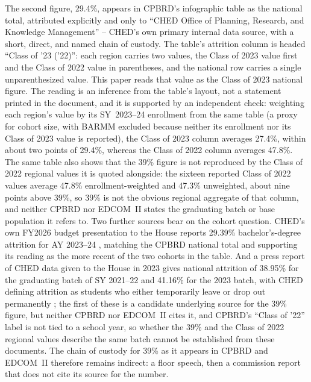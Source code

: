 \documentclass[11pt]{article}
\begin{document}
The second figure, 29.4\%, appears in CPBRD's infographic table as the national total, attributed explicitly and only to ``CHED Office of Planning, Research, and Knowledge Management'' \citep{cpbrd2026} -- CHED's own primary internal data source, with a short, direct, and named chain of custody. The table's attrition column is headed ``Class of '23 ('22)'': each region carries two values, the Class of 2023 value first and the Class of 2022 value in parentheses, and the national row carries a single unparenthesized value. This paper reads that value as the Class of 2023 national figure. The reading is an inference from the table's layout, not a statement printed in the document, and it is supported by an independent check: weighting each region's value by its SY~2023--24 enrollment from the same table (a proxy for cohort size, with BARMM excluded because neither its enrollment nor its Class of 2023 value is reported), the Class of 2023 column averages 27.4\%, within about two points of 29.4\%, whereas the Class of 2022 column averages 47.8\%. The same table also shows that the 39\% figure is not reproduced by the Class of 2022 regional values it is quoted alongside: the sixteen reported Class of 2022 values average 47.8\% enrollment-weighted and 47.3\% unweighted, about nine points above 39\%, so 39\% is not the obvious regional aggregate of that column, and neither CPBRD nor EDCOM~II states the graduating batch or base population it refers to. Two further sources bear on the cohort question. CHED's own FY2026 budget presentation to the House reports 29.39\% bachelor's-degree attrition for AY 2023--24 \citep{ched2025presentation}, matching the CPBRD national total and supporting its reading as the more recent of the two cohorts in the table. And a press report of CHED data given to the House in 2023 gives national attrition of 38.95\% for the graduating batch of SY 2021--22 and 41.16\% for the 2023 batch, with CHED defining attrition as students who either temporarily leave or drop out permanently \citep{chi2023pandemic}; the first of these is a candidate underlying source for the 39\% figure, but neither CPBRD nor EDCOM~II cites it, and CPBRD's ``Class of '22'' label is not tied to a school year, so whether the 39\% and the Class of 2022 regional values describe the same batch cannot be established from these documents. The chain of custody for 39\% as it appears in CPBRD and EDCOM~II therefore remains indirect: a floor speech, then a commission report that does not cite its source for the number.
\end{document}
